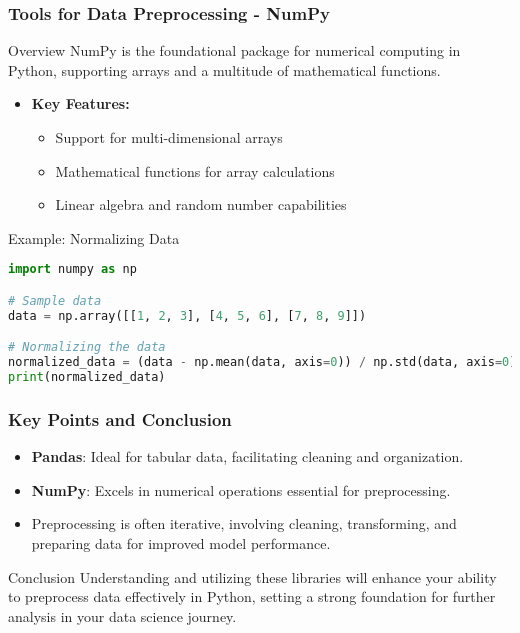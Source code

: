 \documentclass{beamer}
\begin{document}
\begin{frame}[fragile]
    \frametitle{Tools for Data Preprocessing - NumPy}
    \begin{block}{Overview}
        NumPy is the foundational package for numerical computing in Python, supporting arrays and a multitude of mathematical functions.
    \end{block}
    \begin{itemize}
        \item \textbf{Key Features:}
        \begin{itemize}
            \item Support for multi-dimensional arrays
            \item Mathematical functions for array calculations
            \item Linear algebra and random number capabilities
        \end{itemize}
    \end{itemize}
    \begin{block}{Example: Normalizing Data}
        \begin{lstlisting}[language=Python]
import numpy as np

# Sample data
data = np.array([[1, 2, 3], [4, 5, 6], [7, 8, 9]])

# Normalizing the data
normalized_data = (data - np.mean(data, axis=0)) / np.std(data, axis=0)
print(normalized_data)
        \end{lstlisting}
    \end{block}
\end{frame}

\begin{frame}[fragile]
    \frametitle{Key Points and Conclusion}
    \begin{itemize}
        \item \textbf{Pandas}: Ideal for tabular data, facilitating cleaning and organization.
        \item \textbf{NumPy}: Excels in numerical operations essential for preprocessing.
        \item Preprocessing is often iterative, involving cleaning, transforming, and preparing data for improved model performance.
    \end{itemize}
    \begin{block}{Conclusion}
        Understanding and utilizing these libraries will enhance your ability to preprocess data effectively in Python, setting a strong foundation for further analysis in your data science journey.
    \end{block}
\end{frame}
\end{document}
